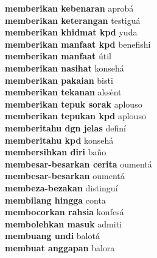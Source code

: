 \textbf{ memberikan kebenaran  } aprobá \\
\textbf{ memberikan keterangan  } testiguá \\
\textbf{ memberikan khidmat kpd  } yuda \\
\textbf{ memberikan manfaat kpd  } benefishi \\
\textbf{ memberikan manfaat  } útil \\
\textbf{ memberikan nasihat  } konsehá \\
\textbf{ memberikan pakaian  } bisti \\
\textbf{ memberikan tekanan  } aksènt \\
\textbf{ memberikan tepuk sorak  } aplouso \\
\textbf{ memberikan tepukan kpd  } aplouso \\
\textbf{ memberitahu dgn jelas  } definí \\
\textbf{ memberitahu kpd  } konsehá \\
\textbf{ membersihkan diri  } baño \\
\textbf{ membesar-besarkan cerita  } oumentá \\
\textbf{ membesar-besarkan  } oumentá \\
\textbf{ membeza-bezakan  } distinguí \\
\textbf{ membilang hingga  } conta \\
\textbf{ membocorkan rahsia  } konfesá \\
\textbf{ membolehkan masuk  } admiti \\
\textbf{ membuang undi  } balotá \\
\textbf{ membuat anggapan  } balora \\
